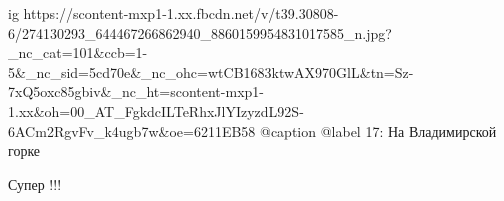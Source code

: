  
 
 
 
 

\ifcmt
  ig https://scontent-mxp1-1.xx.fbcdn.net/v/t39.30808-6/274130293_644467266862940_8860159954831017585_n.jpg?_nc_cat=101&ccb=1-5&_nc_sid=5cd70e&_nc_ohc=wtCB1683ktwAX970GlL&tn=Sz-7xQ5oxc85gbiv&_nc_ht=scontent-mxp1-1.xx&oh=00_AT_FgkdcILTeRhxJlYIzyzdL92S-6ACm2RgvFv_k4ugb7w&oe=6211EB58
  @caption @label 17: На Владимирской горке
\fi

Супер !!!
